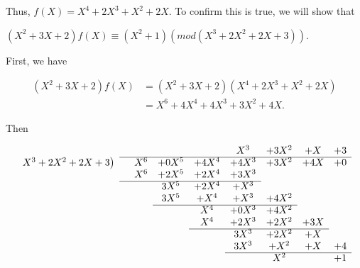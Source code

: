 \documentclass[12pt, a4paper]{article}
\begin{document}
\vspace{4mm}

\noindent Thus, $f(X)=X^4+2X^3+X^2+2X$. To confirm this is true, we will show that 

\vspace{4mm}

\centerline{$(X^2+3X+2)f(X)\equiv(X^2+1)(mod(X^3+2X^2+2X+3))$.}

\newpage

\noindent First, we have

\begin{equation*}
        \begin{split}
            (X^2+3X+2)f(X) &= (X^2+3X+2)(X^4+2X^3+X^2+2X) \\
            &= X^6+4X^4+4X^3+3X^2+4X.
        \end{split}
    \end{equation*}

\vspace{4mm}

\noindent Then

\vspace{4mm}

\[
\begin{array}{m{3.5em}ccccccccc}
& &     &    &      &       &    X^3     & +3X^2    & +X & +3 \\
\cline{3-10}
\multicolumn{2}{l}{X^3+2X^2+2X+3\big)}
        &        &  X^6     &  +0X^5     & +4X^4  &  +4X^3 & +3X^2 & +4X  & +0 \\
&&       &  X^6     &  +2X^5    & +2X^4  &  +3X^3  &  &             &  \\
\cline{3-7}
&&       &       &  3X^5  & +2X^4 &  +X^3 &    &          &   \\
&&       &       &  3X^5  & +X^4 &  +X^3 & +4X^2  &   &  \\
\cline{5-8}
&&       &      &    &  X^4  &  +0X^3 & +4X^2 &   &   \\
&&       &      &    &    X^4   &   +2X^3     &    +2X^2   & +3X  &   \\
\cline{6-9}
&&       &      &    &          &   3X^3 &    +2X^2  &    +X   &   \\
&&     &      &     &      &    3X^3     &      +X^2   &    +X      &   +4 \\
\cline{7-10}
&&   &       &    &      &             &         X^2      &           & +1 \\

\end{array}
\]
\end{document}

